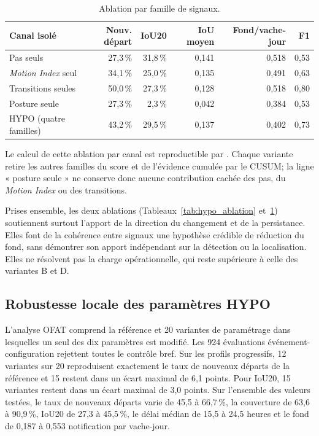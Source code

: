 \begin{table}[H]
  \centering
  \caption{Ablation par famille de signaux.}
  \label{tab:hypo_channels}
  \small
  \begin{tabular}{lrrrrr}
    \toprule
    Canal isolé & Nouv. départ & IoU20 & IoU moyen & Fond/vache-jour & F1 \\
    \midrule
    Pas seuls & 27,3\,\% & 31,8\,\% & 0,141 & 0,518 & 0,53 \\
    \textit{Motion Index} seul & 34,1\,\% & 25,0\,\% & 0,135 & 0,491 & 0,63 \\
    Transitions seules & 50,0\,\% & 27,3\,\% & 0,128 & 0,518 & 0,80 \\
    Posture seule & 27,3\,\% & 2,3\,\% & 0,042 & 0,384 & 0,53 \\
    HYPO (quatre familles) & 43,2\,\% & 29,5\,\% & 0,137 & 0,402 & 0,73 \\
    \bottomrule
  \end{tabular}
\end{table}

Le calcul de cette ablation par canal est reproductible par
. Chaque variante retire les autres familles du
score et de l'évidence cumulée par le CUSUM; la ligne « posture seule » ne conserve donc
aucune contribution cachée des pas, du \textit{Motion Index} ou des transitions.

Prises ensemble, les deux ablations (Tableaux~\ref{tab:hypo_ablation} et~\ref{tab:hypo_channels})
soutiennent surtout l'apport de la direction du changement et de la persistance. Elles font de la
cohérence entre signaux une hypothèse crédible de réduction du fond, sans démontrer son apport
indépendant sur la détection ou la localisation. Elles ne résolvent pas la charge opérationnelle,
qui reste supérieure à celle des variantes B et D.

\subsection{Robustesse locale des paramètres HYPO}
\label{sec:sensibilite}
L'analyse OFAT comprend la référence et 20 variantes de paramétrage dans lesquelles un
seul des dix
paramètres est modifié. Les 924 évaluations événement-configuration rejettent toutes le
contrôle bref. Sur les profils progressifs, 12 variantes sur 20 reproduisent exactement le
taux de nouveaux départs de la référence et 15 restent dans un écart maximal de 6,1 points.
Pour IoU20, 15 variantes restent dans un écart maximal de 3,0 points. Sur l'ensemble des
valeurs testées, le taux de nouveaux départs varie de 45,5 à 66,7\,\%, la couverture de
63,6 à 90,9\,\%, IoU20 de 27,3 à 45,5\,\%, le délai médian de 15,5 à 24,5 heures et le fond
de 0,187 à 0,553 notification par vache-jour.

